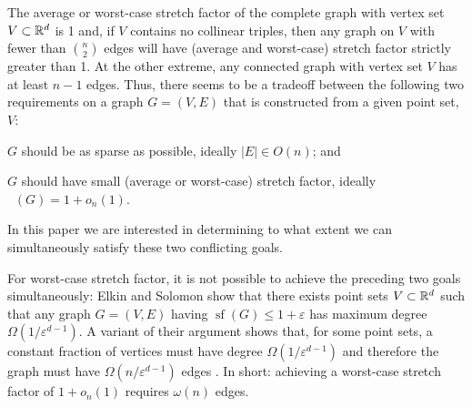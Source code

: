 \documentclass{patmorin}
\DeclareMathOperator{\asf}{asf}
\DeclareMathOperator{\xsf}{(a)sf}
\DeclareMathOperator{\strf}{sf}
\newcommand{\eps}{\varepsilon}
\begin{document}
The average or worst-case stretch factor of the complete graph
with vertex set $V\subset\mathbb{R}^d$ is 1 and, if $V$ contains no
collinear triples, then any graph on $V$ with fewer than $\binom{n}{2}$
edges will have (average and worst-case) stretch factor strictly greater
than 1.  At the other extreme, any connected graph with vertex set $V$
has at least $n-1$ edges.  Thus, there seems to be a tradeoff between
the following two requirements on a graph $G=(V,E)$ that is constructed
from a given point set, $V$:
\begin{compactenum}
  \item $G$ should be as sparse as possible, ideally $|E|\in O(n)$; and

  \item $G$ should have small (average or worst-case) stretch factor,
  ideally $\xsf(G)=1+o_n(1)$.
\end{compactenum}
In this paper we are interested in determining to what extent we can
simultaneously satisfy these two conflicting goals.

For worst-case stretch factor, it is not possible to achieve the preceding
two goals simultaneously: Elkin and Solomon \cite{elkin.solomon:steiner}
show that there exists point sets $V\subset\mathbb{R}^d$ such that any
graph $G=(V,E)$ having $\strf(G)\le 1+\eps$ has maximum degree
$\Omega(1/\eps^{d-1})$.  A variant of their argument shows that,
for some point sets, a constant fraction of vertices must have
degree $\Omega(1/\eps^{d-1})$ and therefore the graph must have
$\Omega(n/\eps^{d-1})$ edges \cite{solomon}. In short: achieving a
worst-case stretch factor of $1+o_n(1)$ requires $\omega(n)$ edges.


\end{document}
